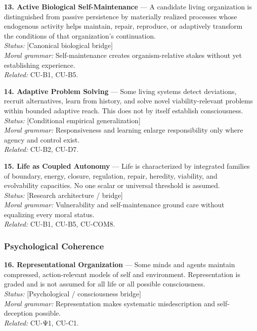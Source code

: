 \documentclass[
  11pt,
]{article}
\begin{document}
\textbf{13. Active Biological Self-Maintenance} --- A candidate living
organization is distinguished from passive persistence by materially
realized processes whose endogenous activity helps maintain, repair,
reproduce, or adaptively transform the conditions of that organization's
continuation.\\
\emph{Status:} {[}Canonical biological bridge{]}\\
\emph{Moral grammar:} Self-maintenance creates organism-relative stakes
without yet establishing experience.\\
\emph{Related:} CU-B1, CU-B5.

\textbf{14. Adaptive Problem Solving} --- Some living systems detect
deviations, recruit alternatives, learn from history, and solve novel
viability-relevant problems within bounded adaptive reach. This does not
by itself establish consciousness.\\
\emph{Status:} {[}Conditional empirical generalization{]}\\
\emph{Moral grammar:} Responsiveness and learning enlarge responsibility
only where agency and control exist.\\
\emph{Related:} CU-B2, CU-D7.

\textbf{15. Life as Coupled Autonomy} --- Life is characterized by
integrated families of boundary, energy, closure, regulation, repair,
heredity, viability, and evolvability capacities. No one scalar or
universal threshold is assumed.\\
\emph{Status:} {[}Research architecture / bridge{]}\\
\emph{Moral grammar:} Vulnerability and self-maintenance ground care
without equalizing every moral status.\\
\emph{Related:} CU-B1, CU-B5, CU-COM8.

\subsubsection{Psychological Coherence}\label{psychological-coherence}

\textbf{16. Representational Organization} --- Some minds and agents
maintain compressed, action-relevant models of self and environment.
Representation is graded and is not assumed for all life or all possible
consciousness.\\
\emph{Status:} {[}Psychological / consciousness bridge{]}\\
\emph{Moral grammar:} Representation makes systematic misdescription and
self-deception possible.\\
\emph{Related:} CU-Ψ1, CU-C1.
\end{document}
